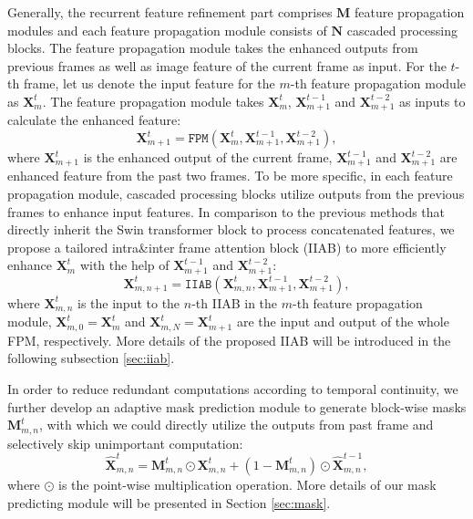 \documentclass[10pt,twocolumn,letterpaper]{article}
\begin{document}
Generally, the recurrent feature refinement part comprises $\textbf{M}$  feature propagation modules and each feature propagation module consists of $ \textbf{N}$ cascaded processing blocks.
%
The feature propagation module takes the enhanced outputs from previous frames as well as image feature of the current frame as input.
%
For the $t$-th frame, let us denote the input feature for the $m$-th feature propagation module as $\bm{X}_m^t$.
%
The feature propagation module takes $\bm{X}_m^t$, $\bm{X}_{m+1}^{t-1}$ and $\bm{X}_{m+1}^{t-2}$ as inputs
to calculate the enhanced feature:
\begin{equation}\label{eq:mask}
    \bm{X}_{m+1}^t = \texttt{FPM}(\bm{X}_m^t, \bm{X}_{m+1}^{t-1}, \bm{X}_{m+1}^{t-2}),
\end{equation}
%
where $\bm{X}_{m+1}^{t}$ is the enhanced output of the current frame, 
$\bm{X}_{m+1}^{t-1}$ and $\bm{X}_{m+1}^{t-2}$ are enhanced feature from the past two frames.
%
To be more specific, in each feature propagation module, cascaded processing blocks utilize outputs from the previous frames to enhance input features.
%
In comparison to the previous methods that directly inherit the Swin transformer block to process concatenated features, we propose a tailored  intra\&inter frame attention block (IIAB)  
to more efficiently enhance $\bm{X}_m^t$ with the help of $\bm{X}_{m+1}^{t-1}$ and $\bm{X}_{m+1}^{t-2}$:
\begin{equation}\label{eq:mask}
    \bm{X}_{m,n+1}^t = \texttt{IIAB}(\bm{X}_{m,n}^t, \bm{X}_{m+1}^{t-1}, \bm{X}_{m+1}^{t-2}),
\end{equation}
where $\bm{X}_{m,n}^t$ is the input to the $n$-th IIAB in the $m$-th feature propagation module, $\bm{X}_{m,0}^t=\bm{X}_{m}^t$ and $\bm{X}_{m,N}^t=\bm{X}_{m+1}^t$ are the input and output of the whole FPM, respectively. 
%
More details of the proposed IIAB will be introduced in the following subsection \ref{sec:iiab}.

In order to reduce redundant computations according to temporal continuity,
we further develop an adaptive mask prediction module to generate block-wise masks $\bm{M}_{m,n}^t$,
with which 
we could directly utilize the outputs from past frame and selectively skip unimportant computation:
\begin{equation}
\label{eq:maskedprocessing}
    \bm{\hat{X}}^t_{m,n} = \bm{M}_{m,n}^{t}\odot \bm{X}^{t}_{m,n} + (1-\bm{M}_{m,n}^{t})\odot \bm{\hat{X}}^{t-1}_{m,n},
\end{equation}
where $\odot$ is the point-wise multiplication operation.
%
More details of our mask predicting module will be presented in Section \ref{sec:mask}.
\end{document}
